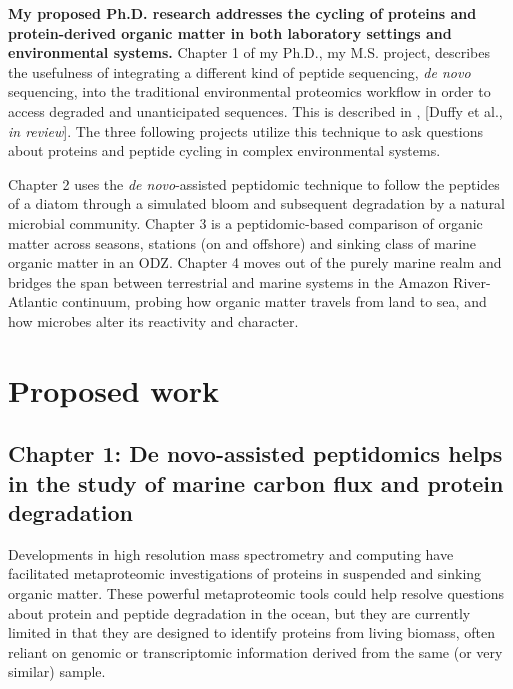 \documentclass[12pt, letterpaper, twoside]{article}
\begin{document}
\textbf{My proposed Ph.D. research addresses the cycling of proteins and protein-derived organic matter in both laboratory settings and environmental systems.} Chapter 1 of my Ph.D., my M.S. project, describes the usefulness of integrating a different kind of peptide sequencing, \textit{de novo} sequencing, into the traditional environmental proteomics workflow in order to access degraded and unanticipated sequences. This is described in , [Duffy et al., \textit{in review}]. The three following projects utilize this technique to ask questions about proteins and peptide cycling in complex environmental systems. 

Chapter 2 uses the \textit{de novo}-assisted peptidomic technique to follow the peptides of a diatom through a simulated bloom and subsequent degradation by a natural microbial community. Chapter 3 is a peptidomic-based comparison of organic matter across seasons, stations (on and offshore) and sinking class of marine organic matter in an ODZ. Chapter 4 moves out of the purely marine realm and bridges the span between terrestrial and marine systems in the Amazon River-Atlantic continuum, probing how organic matter travels from land to sea, and how microbes alter its reactivity and character.

\newpage

\section{Proposed work}

\subsection{{Chapter 1: De novo}-assisted peptidomics helps in the study of marine carbon flux and protein degradation}

Developments in high resolution mass spectrometry and computing have facilitated metaproteomic investigations of proteins in suspended \cite{dong_characterization_2010, bridoux_suspended_2015, bergauer_organic_2017} and sinking \cite{moore_identifying_2012} organic matter. These powerful metaproteomic tools could help resolve questions about protein and peptide degradation in the ocean, but they are currently limited in that they are designed to identify proteins from living biomass, often reliant on genomic or transcriptomic information derived from the same (or very similar) sample.  
\end{document}
